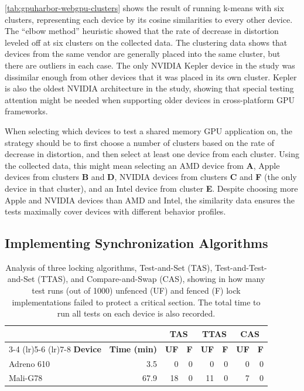 \mytablong\ref{tab:gpuharbor-webgpu-clusters} shows the result of running k-means with six clusters, representing each device by its cosine similarities to every other device. The ``elbow method'' heuristic showed that the rate of decrease in distortion leveled off at six clusters on the collected data. The clustering data shows that devices from the same vendor are generally placed into the same cluster, but there are outliers in each case. The only NVIDIA Kepler device in the study was dissimilar enough from other devices that it was placed in its own cluster. Kepler is also the oldest NVIDIA architecture in the study, showing that special testing attention might be needed when supporting older devices in cross-platform GPU frameworks.

When selecting which devices to test a shared memory GPU application on, the strategy should be to first choose a number of clusters based on the rate of decrease in distortion, and then select at least one device from each cluster. Using the collected data, this might mean selecting an AMD device from \textbf{A}, Apple devices from clusters \textbf{B} and \textbf{D}, NVIDIA devices from clusters \textbf{C} and \textbf{F} (the only device in that cluster), and an Intel device from cluster \textbf{E}. Despite choosing more Apple and NVIDIA devices than AMD and Intel, the similarity data ensures the tests maximally cover devices with different behavior profiles.

\subsection{Implementing Synchronization Algorithms \label{sec:gpuharbor-vulkan-locks}}

\begin{table}
        \centering
        \caption{Analysis of three locking algorithms, Test-and-Set (TAS), Test-and-Test-and-Set (TTAS), and Compare-and-Swap (CAS), showing in how many test runs (out of 1000) unfenced (UF) and fenced (F) lock implementations failed to protect a critical section. The total time to run all tests on each device is also recorded.}
        \begingroup
        \begin{tabular}{ l r r r r r r r }
        \toprule
        & & \multicolumn{2}{c}{\textbf{TAS}} & \multicolumn{2}{c}{\textbf{TTAS}} & \multicolumn{2}{c}{\textbf{CAS}} \\
        \cmidrule(lr){3-4} \cmidrule(lr){5-6} \cmidrule(lr){7-8}
        \textbf{Device} & \textbf{Time (min)} & \textbf{UF} & \textbf{F} & \textbf{UF} & \textbf{F} & \textbf{UF} & \textbf{F} \\
        \midrule
         Adreno 610 & 3.5 & 0 & 0 & 0 & 0 & 0 & 0 \\
         Mali-G78 & 67.9 & 18 & 0 & 11 & 0 & 7 & 0 \\
        \bottomrule
        \end{tabular}
        \endgroup
        \label{tab:gpuharbor-vulkan-locks}
\end{table}

